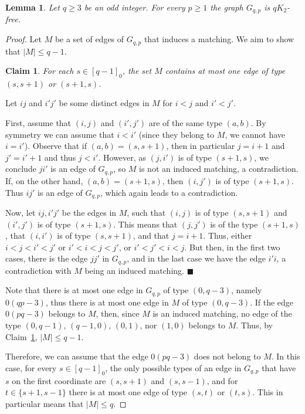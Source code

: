 \documentclass[11pt,a4paper]{article}
\theoremstyle{mystyle}
\newtheorem{lemma}[theorem]{Lemma}
\newtheorem{claim}{Claim}[theorem]
\newenvironment{claimproof}{\noindent {\emph{Proof of Claim.}}}{\hfill$\blacksquare$\medskip}
\begin{document}
\begin{lemma}\label{lem:qk2-free}
Let $q \geq 3$ be an odd integer.
For every $p \geq 1$ the graph $G_{q,p}$ is $qK_2$-free.
\end{lemma}
\begin{proof}
Let $M$ be a set of edges of $G_{q,p}$ that induces a matching. We aim to show that $|M| \leq q-1$.
\begin{claim}\label{cla:one-edge}
    For each $s \in [q-1]_0$, the set $M$ contains at most one edge of type $(s,s+1)$ or $(s+1,s)$.
\end{claim}
\begin{claimproof}
    Let $ij$ and ${i'}{j'}$ be some distinct edges in $M$ for $i<j$ and $i'<j'$.
    
    First, assume that $(i,j)$ and $(i',j')$ are of the same type $(a,b)$.
    By symmetry we can assume that $i<i'$ (since they belong to $M$, we cannot have $i = i'$).
    Observe that if $(a,b)=(s,s+1)$, then in particular $j=i+1$ and $j'=i'+1$ and thus $j<i'$.
    However, as $(j,i')$ is of type $(s+1,s)$, we conclude $ji'$ is an edge of $G_{q,p}$,
    so $M$ is not an induced matching, a contradiction.
    If, on the other hand, $(a,b)=(s+1,s)$, then $(i,j')$ is of type $(s+1,s)$. Thus $ij'$ is an edge of $G_{q,p}$, which again leads to a contradiction. 
    
    Now, let $ij, i'j'$ be the edges in $M$, such that $(i,j)$ is of type $(s,s+1)$ and $(i',j')$ is of type $(s+1,s)$.
    This means that $(j,j')$ is of the type $(s+1,s)$, that $(i,i')$ is of type $(s,s+1)$, and that $j=i+1$.
    Thus, either $i<j<i'<j'$ or $i'<i<j<j'$, or $i'<j'<i<j$.
    But then, in the first two cases, there is the edge $jj'$ in $G_{q,p}$, and in the last case we have the edge $i'i$,
    a contradiction with $M$ being an induced  matching.
\end{claimproof}

Note that there is at most one edge in $G_{q,p}$ of type $(0,q-3)$, namely $0(qp-3)$, thus there is at most one edge in $M$ of type $(0,q-3)$. If the edge $0(pq-3)$ belongs to $M$, then, since $M$ is an induced matching, no edge of the type $(0,q-1)$, $(q-1,0)$, $(0,1)$, nor $(1,0)$ belongs to $M$. Thus, by Claim~\ref{cla:one-edge}, $|M|\leq q-1$.

Therefore, we can assume that the edge $0(pq-3)$ does not belong to $M$. 
In this case, for every $s\in[q-1]_0$, the only possible types of an edge in $G_{q,p}$ that have $s$ on the first coordinate are $(s,s+1)$ and $(s,s-1)$, and for $t \in \{s+1,s-1\}$ there is at most one edge of type $(s,t)$ or $(t,s)$.
This in particular means that $|M| \leq q$.



\end{proof}
\end{document}
